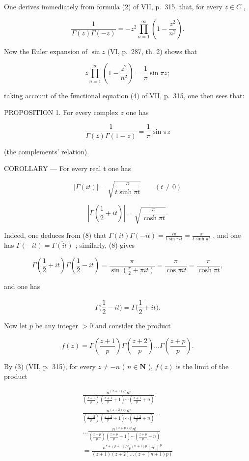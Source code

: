 One derives immediately from formula (2) of VII, p.~315, that, for every \(z \in C\) ,

\[
\frac {1}{\Gamma (z) \Gamma (- z)} = - z ^ {2} \prod_ {n = 1} ^ {\infty} \left(1 - \frac {z ^ {2}}{n ^ {2}}\right).
\]

Now the Euler expansion of \(\sin z\) (VI, p.~287, th. 2) shows that

\[
z \prod_ {n = 1} ^ {\infty} \left(1 - \frac {z ^ {2}}{n ^ {2}}\right) = \frac {1}{\pi} \sin \pi z;
\]

taking account of the functional equation (4) of VII, p.~315, one then sees that:

PROPOSITION 1. For every complex \(z\) one has

\[
\frac {1}{\Gamma (z) \Gamma (1 - z)} = \frac {1}{\pi} \sin \pi z\tag{8}
\]

(the complements' relation).

COROLLARY --- For every real t one has

\[
| \Gamma (i t) | = \sqrt {\frac {\pi}{t \sinh \pi t}} \qquad (t \neq 0)\tag{9}
\]

\[
\left| \Gamma (\frac {1}{2} + i t) \right| = \sqrt {\frac {\pi}{\cosh \pi t}}.\tag{10}
\]

Indeed, one deduces from (8) that \(\Gamma(it)\Gamma(-it) = \frac{i\pi}{t\sin\pi it} = \frac{\pi}{t\sinh\pi t}\) , and one has \(\Gamma(-it) = \overline{\Gamma(it)}\) ; similarly, (8) gives

\[
\Gamma \left(\frac {1}{2} + i t\right) \Gamma \left(\frac {1}{2} - i t\right) = \frac {\pi}{\sin \left(\frac {\pi}{2} + \pi i t\right)} = \frac {\pi}{\cos \pi i t} = \frac {\pi}{\cosh \pi t},
\]

and one has

\[
\Gamma \bigl (\frac {1}{2} - i t \bigr) = \overline {{\Gamma \bigl (\frac {1}{2} + i t \bigr)}}.
\]

Now let \(p\) be any integer \(> 0\) and consider the product

\[
f (z) = \Gamma \left(\frac {z + 1}{p}\right) \Gamma \left(\frac {z + 2}{p}\right) \dots \Gamma \left(\frac {z + p}{p}\right).
\]

By (3) (VII, p.~315), for every \(z \neq -n\) ( \(n \in \mathbf{N}\) ), \(f(z)\) is the limit of the product

\[
\begin{array}{c} \frac {n ^ {(z + 1) / p} n !}{\left(\frac {z + 1}{p}\right) \left(\frac {z + 1}{p} + 1\right) \cdots \left(\frac {z + 1}{p} + n\right)}. \\ \frac {n ^ {(z + 2) / p} n !}{\left(\frac {z + 2}{p}\right) \left(\frac {z + 2}{p} + 1\right) \cdots \left(\frac {z + 2}{p} + n\right)} \dots \\ \dots \frac {n ^ {(z + p) / p} n !}{\left(\frac {z + p}{p}\right) \left(\frac {z + p}{p} + 1\right) \cdots \left(\frac {z + p}{p} + n\right)} \\ = \frac {n ^ {z + (p + 1) / 2} p ^ {(n + 1) p} (n !) ^ {p}}{(z + 1) (z + 2) \ldots (z + (n + 1) p)} \end{array}
\]

